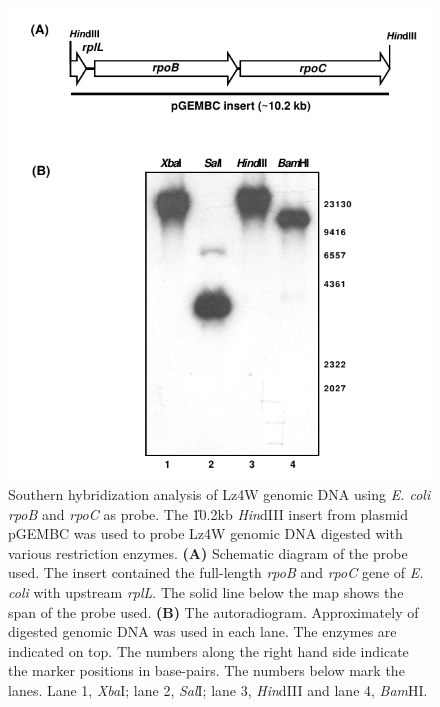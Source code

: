 \begin{figure}[tbp]

\centering

\includegraphics{figures/chap3_beta_southern}

\caption[Southern analysis using \emph{E. coli rpoB} and
\emph{rpoC}]{Southern hybridization analysis of Lz4W genomic DNA
using \emph{E. coli rpoB} and \emph{rpoC} as probe. The
\U{10.2}{kb} \emph{Hin}dIII insert from plasmid pGEMBC
\citep{Igarashi1991} was used to probe Lz4W genomic DNA digested
with various restriction enzymes. \textbf{(A)} Schematic diagram
of the probe used. The insert contained the full-length
\emph{rpoB} and \emph{rpoC} gene of \emph{E. coli} with upstream
\emph{rplL}. The solid line below the map shows the span of the
probe used. \textbf{(B)} The autoradiogram. Approximately
 of digested genomic DNA was used in each lane. The
enzymes are indicated on top. The numbers along the right hand
side indicate the marker positions in base-pairs. The numbers
below mark the lanes. Lane 1, \emph{Xba}I; lane 2, \emph{Sal}I;
lane 3, \emph{Hin}dIII and lane 4, \emph{Bam}HI.}

\label{chap3:beta_southern}

\end{figure}


